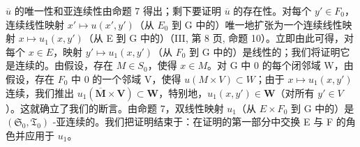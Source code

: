\(\overline{u}\) 的唯一性和亚连续性由命题 7 得出；剩下要证明 \(\overline{u}\) 的存在性。对每个 \(y' \in F_{0}\)，连续线性映射 \(x' \mapsto u(x', y')\)（从 \(E_{0}\) 到 G 中的）唯一地扩张为一个连续线性映射 \(x \mapsto u_{1}(x, y')\)（从 E 到 G 中的）（III, 第 8 页, 命题 10）。立即由此可得，对每个 \(x \in E\)，映射 \(y' \mapsto u_{1}(x, y')\)（从 \(F_{0}\) 到 G 中的）是线性的；我们将证明它是连续的。由假设，存在 \(M \in S_{0}\)，使得 \(x \in M\)。对 G 中 0 的每个闭邻域 W，由假设，存在 \(F_{0}\) 中 0 的一个邻域 V，使得 \(u(M \times V) \subset W\)；由于 \(x \mapsto u_{1}(x, y')\) 连续，我们推出 \(u_{1}(\overline{\mathbf{M}} \times \mathbf{V}) \subset \mathbf{W}\)，特别地，\(u_{1}(x, y') \in \mathbf{W}\)（对所有 \(y' \in V\)）。这就确立了我们的断言。由命题 7，双线性映射 \(u_{1}\)（从 \(E \times F_{0}\) 到 G 中的）是 \((\mathfrak{S}_{0}, \mathfrak{T}_{0})\) -亚连续的。我们把证明结束于：在证明的第一部分中交换 E 与 F 的角色并应用于 \(u_{1}\)。
\relax{}
